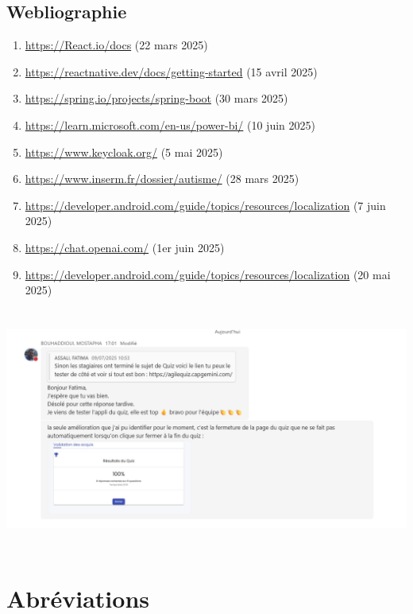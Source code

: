 \documentclass[12pt,a4paper,twoside,openright]{report}
\let\origchapter\chapter
\renewcommand{\chapter}[1]{%
  \cleardoublepage%
  \origchapter{#1}%
}
\begin{document}
\hypertarget{webliographie}{%
\section{Webliographie}\label{webliographie}}

\begin{enumerate}
\def\labelenumi{\arabic{enumi}.}
\item
  \href{https://angular.io/docs}{https://React.io/docs} (22 mars 2025)
\item
  \url{https://reactnative.dev/docs/getting-started} (15 avril 2025)
\item
  \url{https://spring.io/projects/spring-boot} (30 mars 2025)
\item
  \url{https://learn.microsoft.com/en-us/power-bi/} (10 juin 2025)
\item
  \url{https://www.keycloak.org/} (5 mai 2025)
\item
  \url{https://www.inserm.fr/dossier/autisme/} (28 mars 2025)
\item
  \url{https://developer.android.com/guide/topics/resources/localization}
  (7 juin 2025)
\item
  \url{https://chat.openai.com/} (1er juin 2025)
\item
  \url{https://developer.android.com/guide/topics/resources/localization}
  (20 mai 2025)
\end{enumerate}

\includegraphics[width=6.3in,height=3.13056in]{latex_media/media/image66.png}

\newpage
\chapter{Abréviations}
\label{ch:abbreviations}
\end{document}
